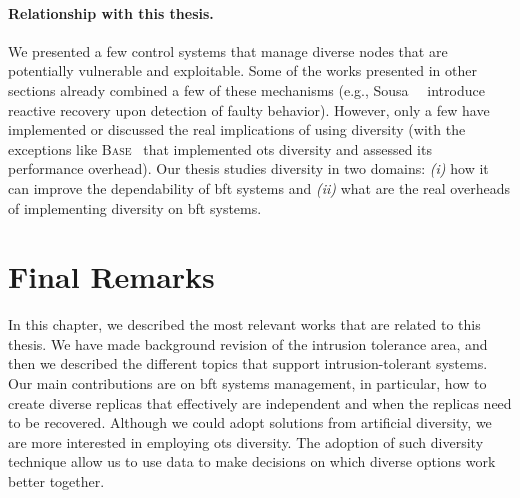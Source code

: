 \paragraph{Relationship with this thesis.}
We presented a few control systems that manage diverse nodes that are potentially vulnerable and exploitable.
Some of the works presented in other sections already combined a few of these mechanisms (e.g., Sousa~\etal{}~\cite{Sousa:2010} introduce reactive recovery upon detection of faulty behavior). 
However, only a few have implemented or discussed the real implications of using diversity (with the exceptions like \textsc{Base}~\cite{Castro:2003} that implemented \gls{ots} diversity and assessed its performance overhead).
Our thesis studies diversity in two domains: \emph{(i)} how it can improve the dependability of \gls{bft} systems and \emph{(ii)} what are the real overheads of implementing diversity on \gls{bft} systems.



\section{Final Remarks}
In this chapter, we described the most relevant works that are related to this thesis.
We have made background revision of the intrusion tolerance area, and then we described the different topics that support intrusion-tolerant systems.
Our main contributions are on \gls{bft} systems management, in particular, how to create diverse replicas that effectively are independent and when the replicas need to be recovered. 
Although we could adopt solutions from artificial diversity, we are more interested in employing \gls{ots} diversity.
The adoption of such diversity technique allow us to use data to make decisions on which diverse options work better together.





